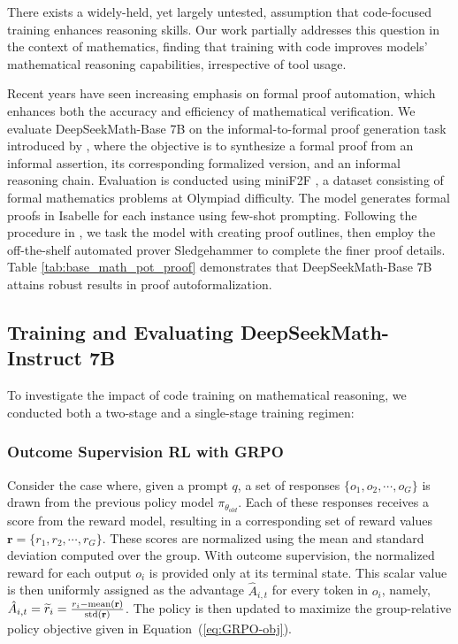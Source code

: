 There exists a widely-held, yet largely untested, assumption that code-focused training enhances reasoning skills. Our work partially addresses this question in the context of mathematics, finding that training with code improves models' mathematical reasoning capabilities, irrespective of tool usage.

Recent years have seen increasing emphasis on formal proof automation, which enhances both the accuracy and efficiency of mathematical verification. We evaluate DeepSeekMath-Base 7B on the informal-to-formal proof generation task introduced by \citep{dsp_proof}, where the objective is to synthesize a formal proof from an informal assertion, its corresponding formalized version, and an informal reasoning chain. Evaluation is conducted using miniF2F \citep{minif2f}, a dataset consisting of formal mathematics problems at Olympiad difficulty. The model generates formal proofs in Isabelle for each instance using few-shot prompting. Following the procedure in \cite{dsp_proof}, we task the model with creating proof outlines, then employ the off-the-shelf automated prover Sledgehammer \citep{sledgehammer} to complete the finer proof details. Table \ref{tab:base_math_pot_proof} demonstrates that DeepSeekMath-Base 7B attains robust results in proof autoformalization.

\subsection{Training and Evaluating DeepSeekMath-Instruct 7B}

To investigate the impact of code training on mathematical reasoning, we conducted both a two-stage and a single-stage training regimen:

\subsubsection{Outcome Supervision RL with GRPO} 
Consider the case where, given a prompt $q$, a set of responses $\{o_1, o_2, \cdots, o_G\}$ is drawn from the previous policy model $\pi_{\theta_{old}}$. Each of these responses receives a score from the reward model, resulting in a corresponding set of reward values $\mathbf{r} = \{r_1, r_2, \cdots, r_G\}$. These scores are normalized using the mean and standard deviation computed over the group. With outcome supervision, the normalized reward for each output $o_i$ is provided only at its terminal state. This scalar value is then uniformly assigned as the advantage $\hat{A}_{i, t}$ for every token in $o_i$, namely, $\hat{A}_{i, t} = \widetilde{r}_i = \frac{r_i- {\rm mean}(\mathbf{r})}{{\rm std}(\mathbf{r})}$. The policy is then updated to maximize the group-relative policy objective given in Equation~(\ref{eq:GRPO-obj}).

